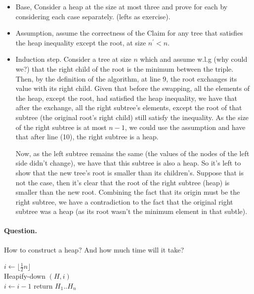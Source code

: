 \begin{itemize} 
  \item Base, Consider a heap at the size at most three and prove for each by considering each case separately. (lefts as exercise).  
  \item Assumption, assume the correctness of the Claim for any tree that satisfies the heap inequality except the root, at size $n^{\prime} < n$. 
  \item Induction step. Consider a tree at size $n$ which and assume w.l.g (why could we?) that the right child of the root is the minimum between the triple. Then, by the definition of the algorithm, at line 9, the root exchanges its value with its right child. Given that before the swapping, all the elements of the heap, except the root, had satisfied the heap inequality, we have that after the exchange, all the right subtree's elements, except the root of that subtree (the original root's right child) still satisfy the inequality. As the size of the right subtree is at most $n-1$, we could use the assumption and have that after line (10), the right subtree is a heap.  
 
    Now, as the left subtree remains the same (the values of the nodes of the left side didn't change), we have that this subtree is also a heap. So it's left to show that the new tree's root is smaller than its children's. Suppose that is not the case, then it's clear that the root of the right subtree (heap) is smaller than the new root. Combining the fact that its origin must be the right subtree, we have a contradiction to the fact that the original right subtree was a heap (as its root wasn't the minimum element in that subtle).  
 
\end{itemize} 
\paragraph{Question.} How to construct a heap? And how much time will it take?   

\begin{algorithm}[H]
  $ i \leftarrow \lfloor \frac{1}{2}n  \rfloor $ \\
  { 
    Heapify-down $\left( H, i \right)$ \\ 
    $ i \leftarrow i - 1 $  
  }
return $H_{1} .. H_{n}$
\end{algorithm}

